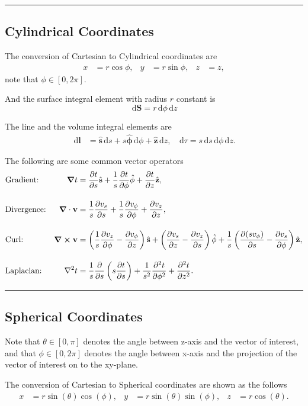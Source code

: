 \documentclass[12pt,english]{article}
\newcommand{\dmr}[1]{\, \mathrm{d}#1} %
\numberwithin{equation}{subsection}
\let\oldhat\hat
\renewcommand{\vec}[1]{\mathbf{#1}}
\renewcommand{\hat}[1]{\oldhat{\mathbf{#1}}}
\begin{document}
\par\noindent\rule{\textwidth}{0.4pt}
\subsection{Cylindrical Coordinates}
The conversion of Cartesian to Cylindrical coordinates\cite{noauthor_cylindrical_2021} are 
\begin{align*}
    x &= r \cos \phi, & y &= r \sin\phi, & z &= z,
\end{align*}
note that $\phi \in [0,2\pi].$

And the surface integral element with radius $r$ constant is
\[
    \dmr{\vec{S}}    = r \dmr{\phi}\dmr{z}
\]    

The line and the volume integral elements are
\begin{align*}
    \dmr{\vec{l}} &= \hat{s}\dmr{s} + s\hat{\phi}\dmr{\phi}+\hat{z}\dmr{z}, & \dmr{\tau} = s\dmr{s}\dmr{\phi}\dmr{z}.
\end{align*}

The following are some common vector operators
\begin{align*}
    &\text{Gradient:} &\grad t  &= \pdv{t}{s}\hat{s}+\frac{1}{s}\pdv{t}{\phi}\hat{\phi}+\pdv{t}{z}\hat{z},\\[1em]
    &\text{Divergence:} &\grad\cdot\vec{v} &= \frac{1}{s}\pdv{v_s}{s}(sv_s)+\frac{1}{s}\pdv{v_\phi}{\phi}+\pdv{v_z}{z},\\[1em]
    &\text{Curl:} &\curl \vec{v} &= \left(\frac{1}{s} \pdv{v_z}{\phi} - \pdv{v_{\phi}}{z} \right)\hat{s} + \left(\pdv{v_{s}}{z} - \pdv{v_z}{s} \right)\hat{\phi} + \frac{1}{s}\left(\pdv{(s v_{\phi})}{s} - \pdv{v_s}{\phi}\right)\hat{z},\\[1em]
    &\text{Laplacian:} &\laplacian t &= \frac{1}{s}\pdv{}{s}\left(s\pdv{t}{s}\right)+\frac{1}{s^2}\pdv[2]{t}{\phi}+\pdv[2]{t}{z}. 
\end{align*}
\par\noindent\rule{\textwidth}{0.4pt}

\subsection{Spherical Coordinates}
Note that $\theta\in[0,\pi]$ denotes the angle between z-axis and the vector of interest, and that $\phi\in[0, 2\pi]$ denotes the angle between x-axis and the projection of the vector of interest on to the xy-plane.\cite{noauthor_cylindrical_2021}

The conversion of Cartesian to Spherical coordinates are shown as the follows
\begin{align*}
    x &= r \sin(\theta)\cos(\phi), & y &= r \sin(\theta)\sin(\phi), & z &= r \cos(\theta).\\
\end{align*}
\end{document}
